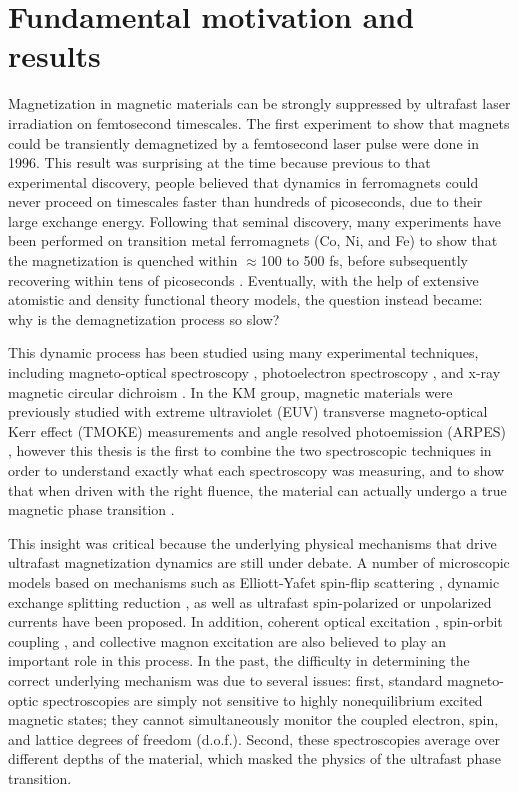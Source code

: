 \section{Fundamental motivation and results}

Magnetization in magnetic materials can be strongly suppressed by ultrafast laser irradiation on femtosecond timescales\cite{E.BeaupaireJ-CMerleA.Daunois1996}. The first experiment to show that magnets could be transiently demagnetized by a femtosecond laser pulse were done in 1996. This result was surprising at the time because previous to that experimental discovery, people believed that dynamics in ferromagnets could never proceed on timescales faster than hundreds of picoseconds, due to their large exchange energy. Following that seminal discovery, many experiments have been performed on transition metal ferromagnets (Co, Ni, and Fe) to show that the magnetization is quenched within $\approx$100 to 500 fs, before subsequently recovering within tens of picoseconds \cite{ Koopmans2005, Rhie2003,  Stamm2007}. Eventually, with the help of extensive atomistic and density functional theory models, the question instead became: why is the demagnetization process so slow?

This dynamic process has been studied using many experimental techniques, including magneto-optical spectroscopy \cite{Carpene2015,Koopmans2005,La-O-Vorakiat2009,Mathias2012,Roth2012,Turgut2016}, photoelectron spectroscopy \cite{Carley2012,Eich2017,Rhie2003}, and x-ray magnetic circular dichroism \cite{Stamm2007,Boeglin2010}. In the KM group, magnetic materials were previously studied with extreme ultraviolet (EUV) transverse magneto-optical Kerr effect (TMOKE) measurements \cite{La-O-Vorakiat2009} and angle resolved photoemission (ARPES) \cite{Chen2017}, however this thesis is the first to combine the two spectroscopic techniques in order to understand exactly what each spectroscopy was measuring, and to show that when driven with the right fluence, the material can actually undergo a true magnetic phase transition \cite{Tengdin2018}. 

This insight was critical because the underlying physical mechanisms that drive ultrafast magnetization dynamics are still under debate. A number of microscopic models based on mechanisms such as Elliott-Yafet spin-flip scattering \cite{Koopmans2005,Koopmans2010}, dynamic exchange splitting reduction \cite{Mueller2011,Mueller2013,Krauß2009}, as well as ultrafast spin-polarized or unpolarized currents \cite{Battiato2010,Eschenlohr2013} have been proposed. In addition, coherent optical excitation \cite{Bigot2009}, spin-orbit coupling \cite{Tows2015,Zhang2000}, and collective magnon excitation \cite{Carpene2015,Zhang2012,Schmidt2010} are also believed to play an important role in this process. In the past, the difficulty in determining the correct underlying mechanism was due to several issues: first, standard magneto-optic spectroscopies are simply not sensitive to highly nonequilibrium excited magnetic states; they cannot simultaneously monitor the coupled electron, spin, and lattice degrees of freedom (d.o.f.). Second, these spectroscopies average over different depths of the material, which masked the physics of the ultrafast phase transition. 

